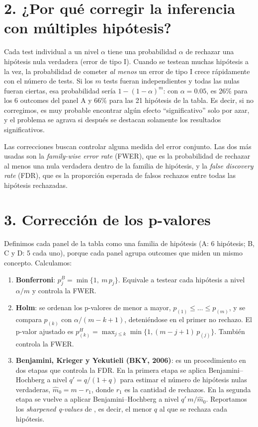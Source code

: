 \documentclass[11pt,a4paper]{article}
\begin{document}
\section*{2. ¿Por qué corregir la inferencia con múltiples hipótesis?}

Cada test individual a un nivel $\alpha$ tiene una probabilidad $\alpha$ de rechazar una hipótesis nula verdadera (error de tipo I). Cuando se testean muchas hipótesis a la vez, la probabilidad de cometer \emph{al menos} un error de tipo I crece rápidamente con el número de tests. Si los $m$ tests fueran independientes y todas las nulas fueran ciertas, esa probabilidad sería $1-(1-\alpha)^m$: con $\alpha=0.05$, es 26\% para los 6 outcomes del panel A y 66\% para las 21 hipótesis de la tabla. Es decir, si no corregimos, es muy probable encontrar algún efecto ``significativo'' solo por azar, y el problema se agrava si después se destacan solamente los resultados significativos.

Las correcciones buscan controlar alguna medida del error conjunto. Las dos más usadas son la \textit{family-wise error rate} (FWER), que es la probabilidad de rechazar al menos una nula verdadera dentro de la familia de hipótesis, y la \textit{false discovery rate} (FDR), que es la proporción esperada de falsos rechazos entre todas las hipótesis rechazadas.

\section*{3. Corrección de los p-valores}

Definimos cada panel de la tabla como una familia de hipótesis (A: 6 hipótesis; B, C y D: 5 cada uno), porque cada panel agrupa outcomes que miden un mismo concepto. Calculamos:

\begin{enumerate}[label=\alph*.]
  \item \textbf{Bonferroni}: $p^{B}_j=\min\{1,\ m\,p_j\}$. Equivale a testear cada hipótesis a nivel $\alpha/m$ y controla la FWER.
  \item \textbf{Holm}: se ordenan los p-valores de menor a mayor, $p_{(1)}\le\dots\le p_{(m)}$, y se compara $p_{(k)}$ con $\alpha/(m-k+1)$, deteniéndose en el primer no rechazo. El p-valor ajustado es $p^{H}_{(k)}=\max_{j\le k}\min\{1,(m-j+1)\,p_{(j)}\}$. También controla la FWER.
  \item \textbf{Benjamini, Krieger y Yekutieli (BKY, 2006)}: es un procedimiento en dos etapas que controla la FDR. En la primera etapa se aplica Benjamini--Hochberg a nivel $q'=q/(1+q)$ para estimar el número de hipótesis nulas verdaderas, $\hat m_0=m-r_1$, donde $r_1$ es la cantidad de rechazos. En la segunda etapa se vuelve a aplicar Benjamini--Hochberg a nivel $q'\,m/\hat m_0$. Reportamos los \textit{sharpened q-values} de \citet{anderson}, es decir, el menor $q$ al que se rechaza cada hipótesis.
\end{enumerate}
\end{document}

